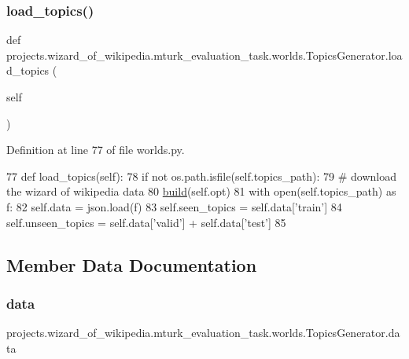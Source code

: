 \subsubsection{\texorpdfstring{load\+\_\+topics()}{load\_topics()}}
{\footnotesize\ttfamily def projects.\+wizard\+\_\+of\+\_\+wikipedia.\+mturk\+\_\+evaluation\+\_\+task.\+worlds.\+Topics\+Generator.\+load\+\_\+topics (\begin{DoxyParamCaption}\item[{}]{self }\end{DoxyParamCaption})}



Definition at line 77 of file worlds.\+py.


\begin{DoxyCode}
77     \textcolor{keyword}{def }load\_topics(self):
78         \textcolor{keywordflow}{if} \textcolor{keywordflow}{not} os.path.isfile(self.topics\_path):
79             \textcolor{comment}{# download the wizard of wikipedia data}
80             \hyperlink{namespaceparlai_1_1mturk_1_1tasks_1_1talkthewalk_1_1download_a8c0fbb9b6dfe127cb8c1bd6e7c4e33fd}{build}(self.opt)
81         with open(self.topics\_path) \textcolor{keyword}{as} f:
82             self.data = json.load(f)
83         self.seen\_topics = self.data[\textcolor{stringliteral}{'train'}]
84         self.unseen\_topics = self.data[\textcolor{stringliteral}{'valid'}] + self.data[\textcolor{stringliteral}{'test'}]
85 
\end{DoxyCode}


\subsection{Member Data Documentation}
\mbox{\label{classprojects_1_1wizard__of__wikipedia_1_1mturk__evaluation__task_1_1worlds_1_1TopicsGenerator_a55a55c6d796feb5538175f71511ef009}} 
\subsubsection{\texorpdfstring{data}{data}}
{\footnotesize\ttfamily projects.\+wizard\+\_\+of\+\_\+wikipedia.\+mturk\+\_\+evaluation\+\_\+task.\+worlds.\+Topics\+Generator.\+data}



